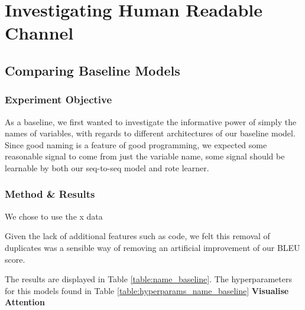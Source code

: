 
\section{Investigating Human Readable Channel} %
\label{sec:investigating_human_readable_channel}

\subsection{Comparing Baseline Models} %
\label{sub:comparing_baseline_models}

\subsubsection{Experiment Objective} %

As a baseline, we first wanted to investigate the informative power of simply the names of variables, with regards to different architectures of our baseline model.
Since good naming is a feature of good programming, we expected some reasonable signal to come from just the variable name, some signal should be learnable by both our seq-to-seq model and rote learner.

\subsubsection{Method \& Results} %
We chose to use the x data

Given the lack of additional features such as code, we felt this removal of duplicates was a sensible way of removing an artificial improvement of our BLEU score. 

The results are displayed in Table \ref{table:name_baseline}. The hyperparameters for this models found in Table \ref{table:hyperparams_name_baseline}
\textbf{Visualise Attention}


